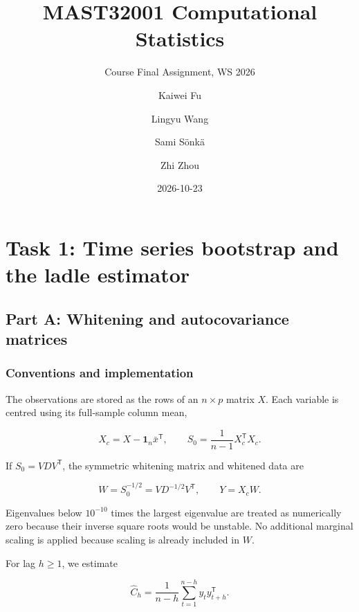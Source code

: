 \documentclass[
  11pt,
  a4paper,
]{article}
\title{MAST32001 Computational Statistics}
\subtitle{Course Final Assignment, WS 2026}
\author{Kaiwei Fu \and Lingyu Wang \and Sami Sönkä \and Zhi Zhou}
\date{2026-10-23}
\begin{document}
\maketitle
\ifdefined\Shaded\renewenvironment{Shaded}{\begin{tcolorbox}[interior hidden, boxrule=0pt, frame hidden, enhanced, borderline west={3pt}{0pt}{shadecolor}, breakable, sharp corners]}{\end{tcolorbox}}\fi

\hypertarget{task-1-time-series-bootstrap-and-the-ladle-estimator}{%
\section{Task 1: Time series bootstrap and the ladle
estimator}\label{task-1-time-series-bootstrap-and-the-ladle-estimator}}

\hypertarget{part-a-whitening-and-autocovariance-matrices}{%
\subsection{Part A: Whitening and autocovariance
matrices}\label{part-a-whitening-and-autocovariance-matrices}}

\hypertarget{conventions-and-implementation}{%
\subsubsection{Conventions and
implementation}\label{conventions-and-implementation}}

The observations are stored as the rows of an \(n\times p\) matrix
\(X\). Each variable is centred using its full-sample column mean,

\[
X_c=X-\mathbf{1}_n\bar{x}^{\mathsf T},
\qquad
S_0=\frac{1}{n-1}X_c^{\mathsf T}X_c.
\]

If \(S_0=VDV^{\mathsf T}\), the symmetric whitening matrix and whitened
data are

\[
W=S_0^{-1/2}=VD^{-1/2}V^{\mathsf T},
\qquad Y=X_cW.
\]

Eigenvalues below \(10^{-10}\) times the largest eigenvalue are treated
as numerically zero because their inverse square roots would be
unstable. No additional marginal scaling is applied because scaling is
already included in \(W\).

For lag \(h\geq1\), we estimate

\[
\widehat C_h
=\frac{1}{n-h}\sum_{t=1}^{n-h}y_ty_{t+h}^{\mathsf T}.
\]
\end{document}
